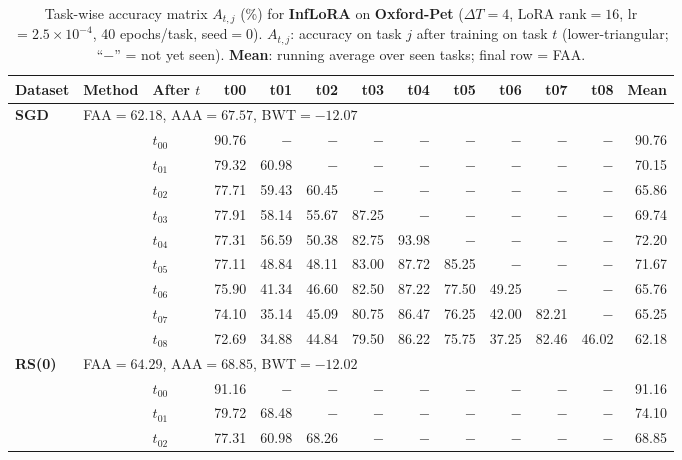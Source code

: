 \begin{table}[ht]
\centering
\caption{%
  Task-wise accuracy matrix $A_{t,j}$ (\%) for \textbf{InfLoRA} on \textbf{Oxford-Pet} ($\Delta T=4$, LoRA rank$=16$, lr$=2.5\times10^{-4}$, 40 epochs/task, seed$=0$).
  $A_{t,j}$: accuracy on task $j$ after training on task $t$  (lower-triangular; ``$-$'' = not yet seen).
  \textbf{Mean}: running average over seen tasks; final row = FAA.
}
\label{tab:raw_inflora_pets}
\setlength{\tabcolsep}{2.8pt}
\renewcommand{\arraystretch}{0.88}
\scriptsize
\begin{tabular}{@{}l l l *{10}{r}@{}}
\toprule
\textbf{Dataset} & \textbf{Method} & \textbf{After $t$} & \textbf{t00} & \textbf{t01} & \textbf{t02} & \textbf{t03} & \textbf{t04} & \textbf{t05} & \textbf{t06} & \textbf{t07} & \textbf{t08} & \textbf{Mean} \\
\midrule
\multirow{10}{*}{\textbf{SGD}} & \multicolumn{11}{l}{\quad\small FAA$=62.18$,\; AAA$=67.57$,\; BWT$=-12.07$} \\
 & & $t_{00}$ & 90.76 & $-$ & $-$ & $-$ & $-$ & $-$ & $-$ & $-$ & $-$ & 90.76 \\
 & & $t_{01}$ & 79.32 & 60.98 & $-$ & $-$ & $-$ & $-$ & $-$ & $-$ & $-$ & 70.15 \\
 & & $t_{02}$ & 77.71 & 59.43 & 60.45 & $-$ & $-$ & $-$ & $-$ & $-$ & $-$ & 65.86 \\
 & & $t_{03}$ & 77.91 & 58.14 & 55.67 & 87.25 & $-$ & $-$ & $-$ & $-$ & $-$ & 69.74 \\
 & & $t_{04}$ & 77.31 & 56.59 & 50.38 & 82.75 & 93.98 & $-$ & $-$ & $-$ & $-$ & 72.20 \\
 & & $t_{05}$ & 77.11 & 48.84 & 48.11 & 83.00 & 87.72 & 85.25 & $-$ & $-$ & $-$ & 71.67 \\
 & & $t_{06}$ & 75.90 & 41.34 & 46.60 & 82.50 & 87.22 & 77.50 & 49.25 & $-$ & $-$ & 65.76 \\
 & & $t_{07}$ & 74.10 & 35.14 & 45.09 & 80.75 & 86.47 & 76.25 & 42.00 & 82.21 & $-$ & 65.25 \\
 & & $t_{08}$ & 72.69 & 34.88 & 44.84 & 79.50 & 86.22 & 75.75 & 37.25 & 82.46 & 46.02 & 62.18 \\
\midrule
\multirow{10}{*}{\textbf{RS(0)}} & \multicolumn{11}{l}{\quad\small FAA$=64.29$,\; AAA$=68.85$,\; BWT$=-12.02$} \\
 & & $t_{00}$ & 91.16 & $-$ & $-$ & $-$ & $-$ & $-$ & $-$ & $-$ & $-$ & 91.16 \\
 & & $t_{01}$ & 79.72 & 68.48 & $-$ & $-$ & $-$ & $-$ & $-$ & $-$ & $-$ & 74.10 \\
 & & $t_{02}$ & 77.31 & 60.98 & 68.26 & $-$ & $-$ & $-$ & $-$ & $-$ & $-$ & 68.85 \\

\end{tabular}
\end{table}

